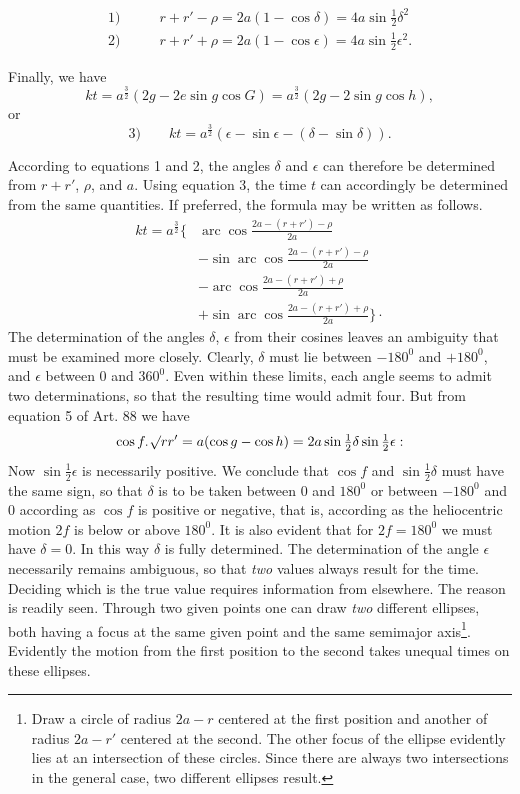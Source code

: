 \[
\begin{aligned}
\mathrm{1)}\qquad&r+r'-\rho=2a(1-\cos\delta)=4a\sin\tfrac12\delta^2\\[.6em]
\mathrm{2)}\qquad&r+r'+\rho=2a(1-\cos\epsilon)=4a\sin\tfrac12\epsilon^2.
\end{aligned}
\]
\par
Finally, we have
\[
kt=a^{\frac32}(2g-2e\sin g\cos G)=a^{\frac32}(2g-2\sin g\cos h),
\]
\noindent{}or
\[
\mathrm{3)}\qquad kt=a^{\frac32}(\epsilon-\sin\epsilon-(\delta-\sin\delta)).
\]
\par
According to equations 1 and 2, the angles $\delta$ and $\epsilon$ can therefore be determined from $r+r'$, $\rho$, and $a$. Using equation 3, the time $t$ can accordingly be determined from the same quantities. If preferred, the formula may be written as follows.
\[
\begin{aligned}
kt=a^{\frac32}\Biggl\{&\operatorname{arc}\cos\frac{2a-(r+r')-\rho}{2a}\\[.6em]
&-\sin\operatorname{arc}\cos\frac{2a-(r+r')-\rho}{2a}\\[.6em]
&-\operatorname{arc}\cos\frac{2a-(r+r')+\rho}{2a}\\[.6em]
&+\sin\operatorname{arc}\cos\frac{2a-(r+r')+\rho}{2a}\Biggr\}\mathpunct{\cdot}
\end{aligned}
\]
\noindent The determination of the angles $\delta$, $\epsilon$ from their cosines leaves an ambiguity that must be examined more closely. Clearly, $\delta$ must lie between $-180^0$ and $+180^0$, and $\epsilon$ between 0 and $360^0$. Even within these limits, each angle seems to admit two determinations, so that the resulting time would admit four. But from equation 5 of Art. 88 we have
\[
\cos f\mathpunct{.}\mathord{{}^{}\!\surd}rr'=a(\cos g-\cos h)=2a\sin\tfrac12\delta\sin\tfrac12\epsilon:
\]
\noindent Now $\sin\tfrac12\epsilon$ is necessarily positive. We conclude that $\cos f$ and $\sin\tfrac12\delta$ must have the same sign, so that $\delta$ is to be taken between 0 and $180^0$ or between $-180^0$ and 0 according as $\cos f$ is positive or negative, that is, according as the heliocentric motion $2f$ is below or above $180^0$. It is also evident that for $2f=180^0$ we must have $\delta=0$. In this way $\delta$ is fully determined. The determination of the angle $\epsilon$ necessarily remains ambiguous, so that \textit{two} values always result for the time. Deciding which is the true value requires information from elsewhere. The reason is readily seen. Through two given points one can draw \textit{two} different ellipses, both having a focus at the same given point and the same semimajor axis\footnote{Draw a circle of radius $2a-r$ centered at the first position and another of radius $2a-r'$ centered at the second. The other focus of the ellipse evidently lies at an intersection of these circles. Since there are always two intersections in the general case, two different ellipses result.}. Evidently the motion from the first position to the second takes unequal times on these ellipses.
